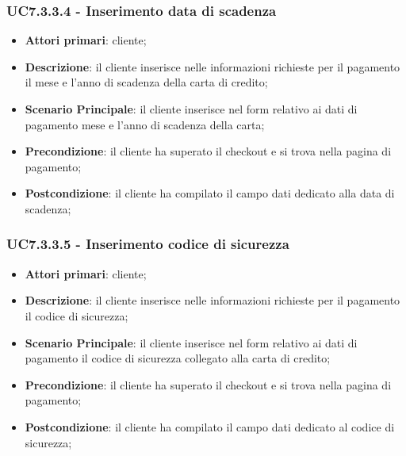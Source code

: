 \subsubsection{UC7.3.3.4 - Inserimento data di scadenza}
\begin{itemize}
\item \textbf{Attori primari}: cliente;
\item \textbf{Descrizione}: il cliente inserisce nelle informazioni richieste per il pagamento il mese e l'anno di scadenza della carta di credito;
\item \textbf{Scenario Principale}: il cliente inserisce nel form relativo ai dati di pagamento mese e l'anno di scadenza della carta;
\item \textbf{Precondizione}: il cliente ha superato il checkout e si trova nella pagina di pagamento;
\item \textbf{Postcondizione}: il cliente ha compilato il campo dati dedicato alla data di scadenza;
\end{itemize}

\subsubsection{UC7.3.3.5 - Inserimento codice di sicurezza}
\begin{itemize}
\item \textbf{Attori primari}: cliente;
\item \textbf{Descrizione}: il cliente inserisce nelle informazioni richieste per il pagamento il codice di sicurezza;
\item \textbf{Scenario Principale}: il cliente inserisce nel form relativo ai dati di pagamento il codice di sicurezza collegato alla carta di credito;
\item \textbf{Precondizione}: il cliente ha superato il checkout e si trova nella pagina di pagamento;
\item \textbf{Postcondizione}: il cliente ha compilato il campo dati dedicato al codice di sicurezza;
\end{itemize}

